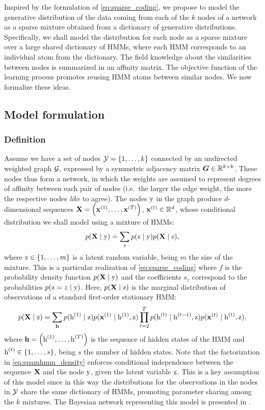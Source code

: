 Inspired by the formulation of \eqref{eq:sparse_coding}, we propose to model the generative distribution of the data coming from each of the $k$ nodes of a network as a sparse mixture obtained from a dictionary of generative distributions. Specifically, we shall model the distribution for each node as a sparse mixture over a large shared dictionary of HMMs, where each HMM corresponds to an individual atom from the dictionary.
The field knowledge about the similarities between nodes is summarized in an affinity matrix. The objective function of the learning process promotes reusing HMM atoms between similar nodes.
We now formalize these ideas.

\subsection{Model formulation}
\subsubsection{Definition}
\label{sec:spamhmm_definition}
Assume we have a set of nodes ${\mathcal{Y}}=\{1, \dots, k\}$ connected by an undirected weighted graph ${\mathcal{G}}$, expressed by a symmetric adjacency matrix ${\bm{G}} \in \mathbb{R}^{k \times k}$. These nodes thus form a network, in which the weights are assumed to represent degrees of affinity between each pair of nodes (i.e.\ the larger the edge weight, the more the respective nodes \textit{like} to agree). The nodes ${\textnormal{y}}$ in the graph produce $d$-dimensional sequences ${\mathbf{X}} = \left({\mathbf{x}}^{(1)}, \dots,{\mathbf{x}}^{(T)} \right)$, ${\mathbf{x}}^{(t)} \in \mathbb{R}^d$, whose conditional distribution we shall model using a mixture of HMMs:
\begin{equation}
    \label{eq:spamhmm_density}
    p({\mathbf{X}} \mid {\textnormal{y}}) = \sum_{{\textnormal{z}}} p({\textnormal{z}}\mid{\textnormal{y}}) p({\mathbf{X}} \mid {\textnormal{z}}),
\end{equation}
where ${\textnormal{z}} \in \{1, \dots, m\}$ is a latent random variable, being $m$ the size of the mixture. This is a particular realization of \eqref{eq:sparse_coding} where $f$ is the probability density function $p({\mathbf{X}} \mid {\textnormal{y}})$ and the coefficients $s_z$ correspond to the probabilities $p({\textnormal{z}} = z \mid {\textnormal{y}})$. Here, $p({\mathbf{X}} \mid {\textnormal{z}})$ is the marginal distribution of observations of a standard first-order stationary HMM:
\begin{equation}
    \label{eq:spamhmm_hmm}
    p({\mathbf{X}} \mid {\textnormal{z}}) = \sum_{{\mathbf{h}}} p({\textnormal{h}}^{(1)} \mid {\textnormal{z}}) p({\mathbf{x}}^{(1)} \mid {\textnormal{h}}^{(1)},{\textnormal{z}}) \prod_{t=2}^T p({\textnormal{h}}^{(t)}\mid{\textnormal{h}}^{(t-1)},{\textnormal{z}}) p({\mathbf{x}}^{(t)} \mid {\textnormal{h}}^{(t)},{\textnormal{z}}),
\end{equation}
where ${\mathbf{h}} = \left({\textnormal{h}}^{(1)}, \dots,{\textnormal{h}}^{(T)} \right)$ is the sequence of hidden states of the HMM and ${\textnormal{h}}^{(t)} \in \{1, \dots, s\}$, being $s$ the number of hidden states. Note that the factorization in \eqref{eq:spamhmm_density} enforces conditional independence between the sequence ${\mathbf{X}}$ and the node ${\textnormal{y}}$, given the latent variable ${\textnormal{z}}$. This is a key assumption of this model since in this way the distributions for the observations in the nodes in ${\mathcal{Y}}$ share the same dictionary of HMMs, promoting parameter sharing among the $k$ mixtures. The Bayesian network representing this model is presented in .

